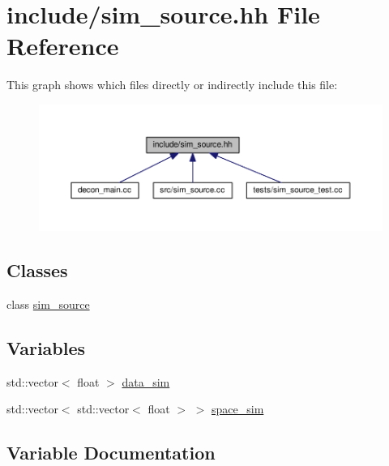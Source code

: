\hypertarget{sim__source_8hh}{}\section{include/sim\+\_\+source.hh File Reference}
\label{sim__source_8hh}
This graph shows which files directly or indirectly include this file\+:
\nopagebreak
\begin{figure}[H]
\begin{center}
\leavevmode
\includegraphics[width=350pt]{sim__source_8hh__dep__incl}
\end{center}
\end{figure}
\subsection*{Classes}
\begin{DoxyCompactItemize}
\item 
class \mbox{\hyperlink{classsim__source}{sim\+\_\+source}}
\end{DoxyCompactItemize}
\subsection*{Variables}
\begin{DoxyCompactItemize}
\item 
std\+::vector$<$ float $>$ \mbox{\hyperlink{sim__source_8hh_a49b7c5a2a0c45a7030e935e2b212d26f}{data\+\_\+sim}}
\item 
std\+::vector$<$ std\+::vector$<$ float $>$ $>$ \mbox{\hyperlink{sim__source_8hh_a98a2ef7afad727679ee5c11bd6cc4df0}{space\+\_\+sim}}
\end{DoxyCompactItemize}


\subsection{Variable Documentation}
\mbox{\label{sim__source_8hh_a49b7c5a2a0c45a7030e935e2b212d26f}} 
